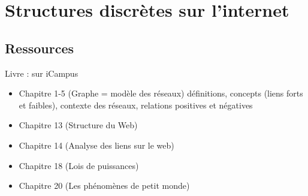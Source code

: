 \section{Structures discrètes sur l'internet}

\subsection{Ressources}
Livre : sur iCampus 
\begin{itemize}
\item Chapitre 1-5 (Graphe = modèle des réseaux) définitions, concepts (liens forts et faibles), contexte des réseaux, relations positives et négatives
\item Chapitre 13 (Structure du Web)
\item Chapitre 14 (Analyse des liens sur le web)
\item Chapitre 18 (Lois de puissances)
\item Chapitre 20 (Les phénomènes de petit monde)
\end{itemize}
